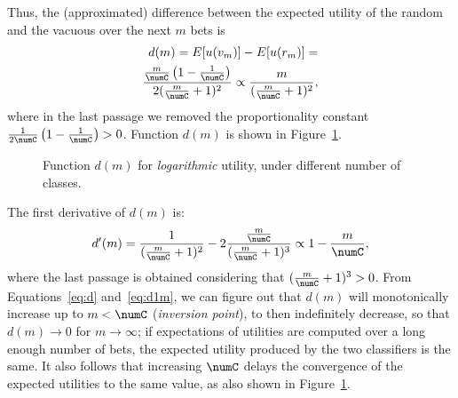 \documentclass[a4paper,10pt,reqno]{amsart}
\theoremstyle{remark}
\begin{document}
Thus, the (approximated) difference between the expected utility of the random and
the vacuous over the next $m$ bets is
\begin{align}
d(m)=E[u(v_m)]-E[u(r_m)]=\notag\\
\frac{\frac{m}{\numC}\left(1-\frac{1}{\numC}\right)}{2(\frac{m}{\numC}+1)^{2}} \propto\frac{m}{(\frac{m}{\numC}+1)^{2}},\label{eq:d}
\end{align}
where in the last passage we removed the proportionality constant $\frac{1}{2\numC}\left(1-\frac{1}{\numC}\right)>0$.
Function $d(m)$ is shown in Figure~\ref{fig:log_util}.
\begin{figure}[!ht]
\caption{Function $d(m)$ for \emph{logarithmic} utility, under different number of classes.\label{fig:log_util}}
\end{figure}

The first derivative of  $d(m)$ is:
\begin{equation}
d'(m)=\frac{1}{(\frac{m}{\numC}+1)^2}-2\frac{\frac{m}{\numC}}{(\frac{m}{\numC}+1)^3}
\propto 1-\frac{m}{\numC},\label{eq:d1m}
\end{equation}
where the  last passage is obtained considering that $(\frac{m}{\numC}+1)^3>0$.
From Equations~\eqref{eq:d} and~\eqref{eq:d1m}, we can figure out that $d(m)$
will monotonically increase up to $m<\numC$ (\emph{inversion point}), to then
indefinitely decrease, so that  $d(m)\rightarrow0$ for $m\rightarrow\infty$; if expectations of utilities are computed over 
a long enough number of bets, the expected utility produced by the two classifiers is the same.
It also follows that increasing $\numC$ delays the convergence of the expected utilities to the same value, as also shown in Figure~\ref{fig:log_util}.
\end{document}
